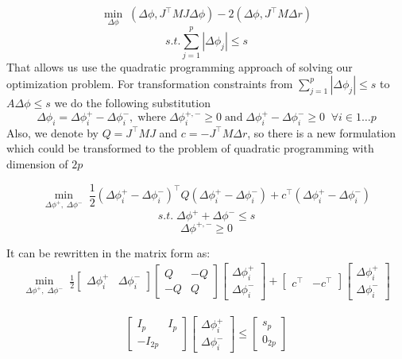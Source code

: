 \documentclass[12pt,twoside]{article}
\begin{document}
$$\min_{\Delta \phi} \; (\Delta \phi, J^{\top}MJ \Delta \phi)-2(\Delta \phi, J^{\top}M\Delta r)$$
$$s.t. \sum\limits_{j=1}^{p} |\Delta\phi_j| \leqslant  s$$
That allows us use the quadratic programming approach of solving our optimization problem. For transformation constraints from  $\sum\limits_{j=1}^{p} |\Delta\phi_j| \leqslant s$ to $A\Delta\phi\leqslant s$ we do the following substitution $$\Delta\phi_i = \Delta\phi_i^+ - \Delta\phi_i^-, \; \text{where}  \;\Delta\phi_i^{+,-} \geqslant 0 \;\text{and}\; \Delta\phi_i^+ - \Delta\phi_i^- \geqslant 0 \;\;\forall i \in 1\dots p$$
Also, we denote by $Q=J^{\top}MJ$ and $c = -J^{\top}M\Delta r$, so there is a new formulation which could be transformed to the problem of quadratic programming with dimension of $2p$

$$ \min_{\Delta \phi^+,\; \Delta \phi^-} \; \frac{1}{2}(\Delta\phi_i^+ - \Delta\phi_i^-)^{\top}Q(\Delta\phi_i^+ - \Delta\phi_i^-) + c^{\top}(\Delta\phi_i^+ - \Delta\phi_i^-)$$
$$ s.t. \;\Delta \phi^+ + \Delta \phi^- \leqslant s$$
$$\Delta \phi^{+,-}\geqslant 0$$

It can be  rewritten in the matrix form as: 
\begin{gather}
\min_{\Delta \phi^+,\; \Delta \phi^-} \; \frac{1}{2}\begin{bmatrix} \Delta\phi_i^+ & \Delta\phi_i^- \end{bmatrix} \begin{bmatrix} Q & -Q \\ -Q 
& Q\end{bmatrix}\begin{bmatrix} \Delta\phi_i^+ \\ \Delta\phi_i^- \end{bmatrix}+\begin{bmatrix} c^{\top} & -c^{\top}\end{bmatrix}\begin{bmatrix} \Delta\phi_i^+ \\ \Delta\phi_i^- \end{bmatrix}
\end{gather}

\begin{gather}
\begin{bmatrix} I_{p}& I_{p} \\ -I_{2p} &\end{bmatrix}\begin{bmatrix} \Delta\phi_i^+ \\ \Delta\phi_i^- \end{bmatrix}\leq \begin{bmatrix} s_{p} \\ 0_{2p} \end{bmatrix}
\end{gather}
\end{document}
